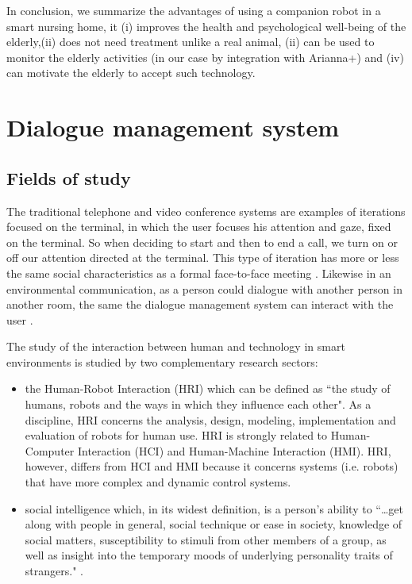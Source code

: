 \documentclass{thesisreport}
\begin{document}
In conclusion, we summarize the advantages of using a companion robot in a smart nursing home, it (i) improves the health and psychological well-being of the elderly,(ii) does not need treatment unlike a real animal, (ii) can be used to monitor the elderly activities (in our case by integration with Arianna+) and (iv) can motivate the elderly to accept such technology.

 \section{Dialogue management system} \label{speech}
 \subsection{Fields of study}
 The traditional telephone and video conference systems are examples of iterations focused on the terminal, in which the user focuses his attention and gaze, fixed on the terminal. So when deciding to start and then to end a call, we turn on or off our attention directed at the terminal. This type of iteration has more or less the same social characteristics as a formal face-to-face meeting \cite{augusto2010ambient}.
 Likewise in an environmental communication, as a person could dialogue with another person in another room, the same the dialogue management system can interact with the  user .
 
 The study of the interaction between human and technology in smart environments is studied by two complementary research sectors:
 \begin{itemize}
    \item the Human-Robot Interaction (HRI) which can be defined as ``the study of humans, robots and the ways in which they influence each other". As a discipline, HRI concerns the analysis, design, modeling, implementation and evaluation of robots for human use.
    HRI is strongly related to Human-Computer Interaction (HCI) and Human-Machine Interaction (HMI). HRI, however, differs from HCI and HMI because it concerns systems (i.e. robots) that have more complex and dynamic control systems.
     
    \item social intelligence which, in its widest definition, is a person's ability to ``\dots get along with people in general, social technique or ease in society, knowledge of social matters, susceptibility to stimuli from other members of a group, as well as insight into the temporary moods of underlying personality traits of strangers." \cite{vernon1933some}.
 \end{itemize}
\end{document}

